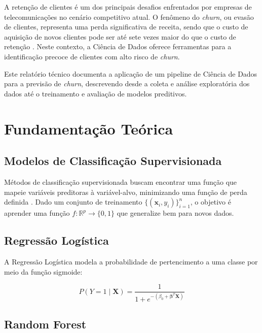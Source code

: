 \documentclass[
    article,
    12pt,
    oneside,
    a4paper,
    english,
    brazilian
    ]{abntex2}
\numberwithin{equation}{section}
\begin{document}
A retenção de clientes é um dos principais desafios enfrentados por empresas de telecomunicações no cenário competitivo atual. O fenômeno do \textit{churn}, ou evasão de clientes, representa uma perda significativa de receita, sendo que o custo de aquisição de novos clientes pode ser até sete vezes maior do que o custo de retenção \cite{provost2013}. Neste contexto, a Ciência de Dados oferece ferramentas para a identificação precoce de clientes com alto risco de \textit{churn}.

Este relatório técnico documenta a aplicação de um pipeline de Ciência de Dados para a previsão de \textit{churn}, descrevendo desde a coleta e análise exploratória dos dados até o treinamento e avaliação de modelos preditivos.

\section{Fundamentação Teórica}

\subsection{Modelos de Classificação Supervisionada}

Métodos de classificação supervisionada buscam encontrar uma função que mapeie variáveis preditoras à variável-alvo, minimizando uma função de perda definida \cite{hastie2009}. Dado um conjunto de treinamento $\{(\mathbf{x}_i, y_i)\}_{i=1}^n$, o objetivo é aprender uma função $f: \mathbb{R}^p \to \{0,1\}$ que generalize bem para novos dados.

\subsection{Regressão Logística}

A Regressão Logística modela a probabilidade de pertencimento a uma classe por meio da função sigmoide:

\begin{equation}
    P(Y = 1 \mid \mathbf{X}) = \frac{1}{1 + e^{-(\beta_0 + \boldsymbol{\beta}^T \mathbf{X})}}
    \label{eq:logistic}
\end{equation}

\subsection{Random Forest}
\end{document}
